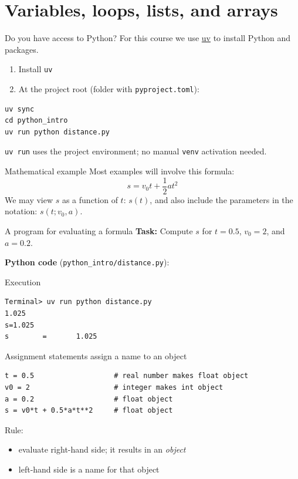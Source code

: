\section{Variables, loops, lists, and arrays}

\begin{frame}[fragile]{Do you have access to Python?}
  For this course we use \href{https://docs.astral.sh/uv/}{uv} to install Python and packages.

  \begin{enumerate}
    \item Install \texttt{uv}
    \item At the project root (folder with \texttt{pyproject.toml}):
  \end{enumerate}
\begin{lstlisting}[style=terminal]
uv sync
cd python_intro
uv run python distance.py
\end{lstlisting}
  \texttt{uv run} uses the project environment; no manual \texttt{venv} activation needed.
\end{frame}

\begin{frame}{Mathematical example}
  Most examples will involve this formula:
  \begin{equation}
    s = v_0 t + \frac{1}{2} a t^2
  \end{equation}
  We may view $s$ as a function of $t$: $s(t)$, and also include the
  parameters in the notation: $s(t;v_0,a)$.
\end{frame}

\begin{frame}[fragile]{A program for evaluating a formula}
  \textbf{Task:} Compute $s$ for $t=0.5$, $v_0=2$, and $a=0.2$.

  \textbf{Python code} (\texttt{python\_intro/distance.py}):

\end{frame}

\begin{frame}[fragile]{Execution}
\begin{lstlisting}[style=terminal]
Terminal> uv run python distance.py
1.025
s=1.025
s        =       1.025
\end{lstlisting}
\end{frame}

\begin{frame}[fragile]{Assignment statements assign a name to an object}
\begin{lstlisting}[style=pythoncompact]
t = 0.5                   # real number makes float object
v0 = 2                    # integer makes int object
a = 0.2                   # float object
s = v0*t + 0.5*a*t**2     # float object
\end{lstlisting}
  Rule:
  \begin{itemize}
    \item evaluate right-hand side; it results in an \emph{object}
    \item left-hand side is a name for that object
  \end{itemize}
\end{frame}

